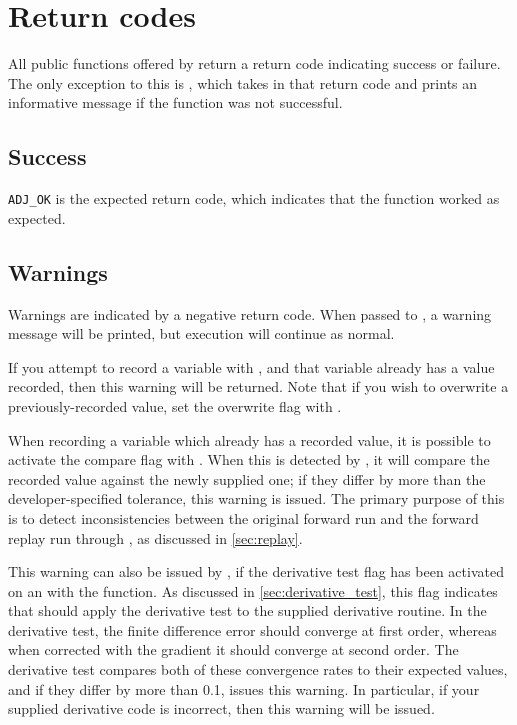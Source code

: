 \chapter{Return codes}

All public functions offered by \libadjoint return a return code indicating
success or failure. The only exception to this is , which
takes in that return code and prints an informative message if the function was
not successful.

\section{Success}
\texttt{ADJ_OK} is the expected return code, which indicates that the function
worked as expected.

\section{Warnings}
Warnings are indicated by a negative return code. When passed to ,
a warning message will be printed, but execution will continue as normal.

If you attempt to record a variable with , and that variable
already has a value recorded, then this warning will be returned.
Note that if you wish to overwrite a previously-recorded value, set the overwrite flag
with .

When recording a variable which already has a recorded value, it is possible to activate the
compare flag with . When this is detected by ,
it will compare the recorded value against the newly supplied one; if they differ by more than
the developer-specified tolerance, this warning is issued. The primary purpose of this is to detect
inconsistencies between the original forward run and the forward replay run through \libadjoint,
as discussed in \autoref{sec:replay}.

This warning can also be issued by ,
if the derivative test flag has been activated on an  with the  function.
As discussed in \autoref{sec:derivative_test}, this flag indicates that \libadjoint should apply the derivative
test to the supplied derivative routine. In the derivative test, the finite difference error should converge
at first order, whereas when corrected with the gradient it should converge at second order. The derivative test
compares both of these convergence rates to their expected values, and if they differ by more than 0.1, issues this warning.
In particular, if your supplied derivative code is incorrect, then this warning will be issued.

